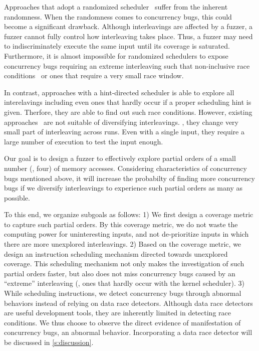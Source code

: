 %
Approaches that adopt a randomized scheduler~\cite{krace, ski, muzz}
suffer from the inherent randomness.
%
When the randomness comes to concurrency bugs, this could become a
significant drawback.
%
Although interleavings are affected by a fuzzer, a fuzzer cannot fully
control how interleaving takes place. Thus, a fuzzer may need to
indiscriminately execute the same input until its coverage is
saturated.
%
Furthermore, it is almost impossible for randomized schedulers to
expose concurrency bugs requiring an extreme interleaving such that
non-inclusive race conditions~\cite{exprace} or ones that
require a very small race window.


In contrast, approaches with a hint-directed scheduler is able to
explore all interelavings including even ones that hardly occur if a
proper scheduling hint is given. Therfore, they are able to find out
such race conditions.
%
However, existing approaches~\cite{razzer, snowboard} are not suitable
of diversifying interleavings. \ie, they change very small part of
interleaving across runs.
%
Even with a single input, they require a large number of execution to
test the input enough.


%
Our goal is to design a fuzzer to effectively explore partial orders
of a small number (\eg, four) of memory accesses.
%
Considering characteristics of concurrency bugs mentioned above, it
will increase the probabilty of finding more concurrency bugs if we
diversify interleavings to experience such partial orders as many as
possible.

To this end, we organize subgoals as follows:
%
1) We first design a coverage metric to capture such partial orders.
By this coverage metric, we do not waste the computing power for
uninteresting inputs, and not de-prioritize inputs in which there are
more unexplored interleavings.
%
2) Based on the coverage metric, we design an instruction scheduling
mechanism directed towards unexplored coverage.
%
This scheduling mechanism not only makes the investigation of such
partial orders faster, but also does not miss concurrency bugs caused
by an ``extreme'' interleaving (\ie, ones that hardly occur with the
kernel scheduler).
%
3) While scheduling instructions, we detect concurrency bugs through
abnormal behaviors instead of relying on data race detectors.
%
Although data race detectors are useful development tools, they are
inherently limited in detecting race conditions.
%
We thus choose to observe the direct evidence of manifestation of
concurrency bugs, an abnormal behavior.
%
Incorporating a data race detector will be discussed in
\autoref{s:discussion}.




